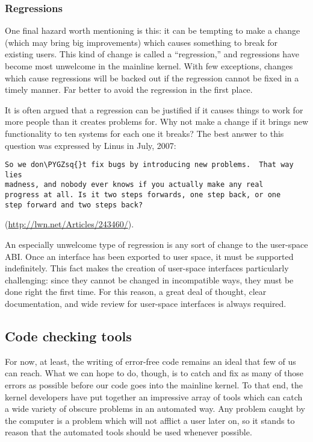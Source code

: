 \documentclass[a4paper,8pt,english]{sphinxmanual}
\def\PYGZsq{\char`\'}
\renewcommand\PYGZsq{\textquotesingle}
\begin{document}
\subsubsection{Regressions}
\label{process/4.Coding:regressions}
One final hazard worth mentioning is this: it can be tempting to make a
change (which may bring big improvements) which causes something to break
for existing users.  This kind of change is called a ``regression,'' and
regressions have become most unwelcome in the mainline kernel.  With few
exceptions, changes which cause regressions will be backed out if the
regression cannot be fixed in a timely manner.  Far better to avoid the
regression in the first place.

It is often argued that a regression can be justified if it causes things
to work for more people than it creates problems for.  Why not make a
change if it brings new functionality to ten systems for each one it
breaks?  The best answer to this question was expressed by Linus in July,
2007:

\begin{Verbatim}[commandchars=\\\{\}]
So we don\PYGZsq{}t fix bugs by introducing new problems.  That way lies
madness, and nobody ever knows if you actually make any real
progress at all. Is it two steps forwards, one step back, or one
step forward and two steps back?
\end{Verbatim}

(\href{http://lwn.net/Articles/243460/}{http://lwn.net/Articles/243460/}).

An especially unwelcome type of regression is any sort of change to the
user-space ABI.  Once an interface has been exported to user space, it must
be supported indefinitely.  This fact makes the creation of user-space
interfaces particularly challenging: since they cannot be changed in
incompatible ways, they must be done right the first time.  For this
reason, a great deal of thought, clear documentation, and wide review for
user-space interfaces is always required.


\subsection{Code checking tools}
\label{process/4.Coding:code-checking-tools}
For now, at least, the writing of error-free code remains an ideal that few
of us can reach.  What we can hope to do, though, is to catch and fix as
many of those errors as possible before our code goes into the mainline
kernel.  To that end, the kernel developers have put together an impressive
array of tools which can catch a wide variety of obscure problems in an
automated way.  Any problem caught by the computer is a problem which will
not afflict a user later on, so it stands to reason that the automated
tools should be used whenever possible.
\end{document}
